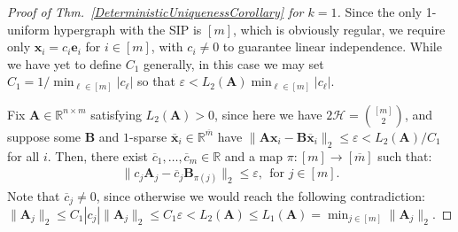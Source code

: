 \documentclass[journal, twocolumn]{IEEEtran}
\begin{document}
\begin{proof}[Proof of Thm.~\ref{DeterministicUniquenessCorollary} for $k=1$]
Since the only 1-uniform hypergraph with the SIP is $[m]$, which is obviously regular, we require only $\mathbf{x}_i = c_i \mathbf{e}_i$ for $i \in [m]$, with $c_i \neq 0$ to guarantee  linear independence. While we have yet to define $C_1$ generally, in this case we may set $C_1 = 1/ \min_{\ell \in [m]} |c_{\ell}|$ so that $\varepsilon < L_2(\mathbf{A})  \min_{\ell \in [m]} |c_{\ell}|$. 

Fix $\mathbf{A} \in \mathbb{R}^{n \times m}$ satisfying $L_2(\mathbf{A}) > 0$, since here we have $2\mathcal{H} = {[m] \choose 2}$, and suppose some $\mathbf{B}$ and $1$-sparse $\mathbf{\overline x}_i \in \mathbb{R}^{\overline m}$ have  $\|\mathbf{A}\mathbf{x}_i - \mathbf{B}\mathbf{\overline x}_i\|_2 \leq \varepsilon < L_2(\mathbf{A}) / C_1$ for all $i$. Then, there exist $\overline{c}_1, \ldots, \overline{c}_m \in \mathbb{R}$ and a map $\pi: [m] \to [\overline m]$ such that:
\begin{align}\label{1D}
\|c_j\mathbf{A}_j - \overline{c}_j\mathbf{B}_{\pi(j)}\|_2 \leq \varepsilon,\ \ \text{for $j \in [m]$}.
\end{align} 
Note that $\overline{c}_j \neq 0$, since otherwise we would reach the following contradiction: $\|\mathbf{A}_j \|_2 \leq C_1 |c_j| \|\mathbf{A}_j \|_2  \leq C_1\varepsilon < L_2(\mathbf{A}) \leq L_1(\mathbf{A}) = \min_{j \in [m]} \|\mathbf{A}_{j}\|_2$. %


\end{proof}
\end{document}
